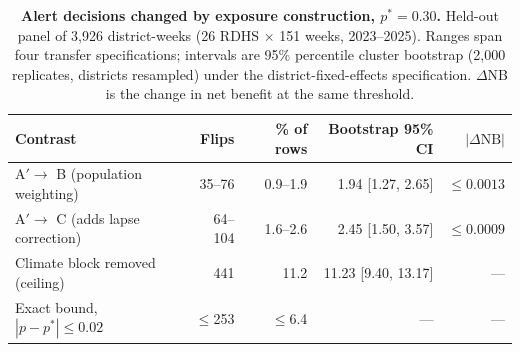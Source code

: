 \begin{table}[htbp]
\centering
\caption{\textbf{Alert decisions changed by exposure construction, $p^*=0.30$.} Held-out panel of 3{,}926 district-weeks (26 RDHS $\times$ 151 weeks, 2023--2025). Ranges span four transfer specifications; intervals are 95\% percentile cluster bootstrap (2{,}000 replicates, districts resampled) under the district-fixed-effects specification. $\Delta$NB is the change in net benefit at the same threshold.}
\label{tab:wp5-flips}
\begin{tabular}{lrrrr}
\toprule
Contrast & Flips & \% of rows & Bootstrap 95\% CI & $|\Delta \mathrm{NB}|$ \\
\midrule
A$'\to$ B (population weighting) & 35--76  & 0.9--1.9  & 1.94 [1.27, 2.65]    & $\le 0.0013$ \\
A$'\to$ C (adds lapse correction) & 64--104 & 1.6--2.6  & 2.45 [1.50, 3.57]    & $\le 0.0009$ \\
Climate block removed (ceiling)   & 441     & 11.2      & 11.23 [9.40, 13.17]  & --- \\
Exact bound, $|p-p^*|\le0.02$     & $\le$253 & $\le$6.4 & ---                  & --- \\
\bottomrule
\end{tabular}
\end{table}

